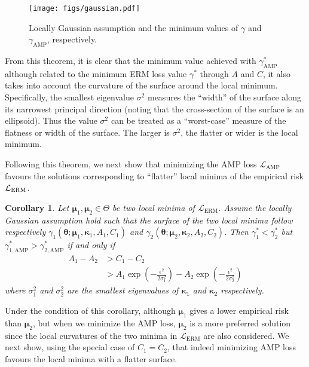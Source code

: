 \documentclass[final]{cvpr}
\newtheorem{cor}{Corollary}
\begin{document}
\begin{figure}[t]
\centering
\texttt{[image: figs/gaussian.pdf]}\caption{Locally Gaussian assumption and the minimum values of $\gamma$ and $\gamma_\mathrm{AMP}$, respectively.}
\label{fig:gaussian}
\end{figure}

From this theorem, it is clear that the minimum value achieved with $\gamma^\ast_\mathrm{AMP}$ although related to the minimum ERM loss value $\gamma^\ast$ through $A$ and $C$, it also takes into account the curvature of the surface around the local minimum. Specifically, the smallest eigenvalue $\sigma^2$ measures the ``width'' of the surface along its narrowest principal direction (noting that the cross-section of the surface is an ellipsoid).  Thus the value $\sigma^2$ can be treated as a ``worst-case'' measure of the flatness or width of the surface. The larger is $\sigma^2$, the flatter or wider is the local minimum. 

Following this theorem, we next show that minimizing the AMP loss ${\mathcal L}_\mathrm{AMP}$ favours the solutions corresponding to ``flatter'' local minima of the empirical risk ${\cal L}_\mathrm{ERM}$. 

\begin{cor}
Let $\boldsymbol{\mu}_1, \boldsymbol{\mu}_2\in\Theta$ be two local minima of $\mathcal{L}_\mathrm{ERM}$. Assume the locally Gaussian assumption hold such that the surface of the two local minima follow respectively $\gamma_1(\boldsymbol{\theta};\boldsymbol{\mu}_1,\boldsymbol{\kappa}_1,A_1,C_1)$ and $\gamma_2(\boldsymbol{\theta};\boldsymbol{\mu}_2,\boldsymbol{\kappa}_2,A_2,C_2)$. Then $\gamma_1^\ast<\gamma_2^\ast$ but $\gamma_{1,\mathrm{AMP}}^\ast>\gamma_{2,\mathrm{AMP}}^\ast$ if and only if 
\begin{align}
A_1 - A_2 & > C_1 - C_2 \nonumber\\
& > A_1 \exp\left(-\frac{\epsilon^2}{2\sigma_1^2}\right)
- A_2 \exp\left(-\frac{\epsilon^2}{2\sigma_2^2}\right) 
\end{align}
where $\sigma_1^2$ and $\sigma_2^2$ are the smallest eigenvalues of $\boldsymbol{\kappa}_1$ and $\boldsymbol{\kappa}_2$ respectively. 
\end{cor}

Under the condition of this corollary, although $\boldsymbol{\mu}_1$ gives a lower empirical risk than $\boldsymbol{\mu}_2$, but when we minimize the AMP loss, $\boldsymbol{\mu}_2$ is a more preferred solution since the local curvatures of the two minima in $\mathcal{L}_\mathrm{ERM}$ are also considered. We next show, using the special case of $C_1=C_2$, that indeed minimizing AMP loss favours the local minima with a flatter surface. 
\end{document}
